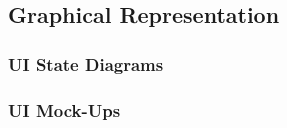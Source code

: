 

\subsection{Graphical Representation}
\bigskip

\subsubsection{UI State Diagrams}








\pagebreak
\subsubsection{UI Mock-Ups}















